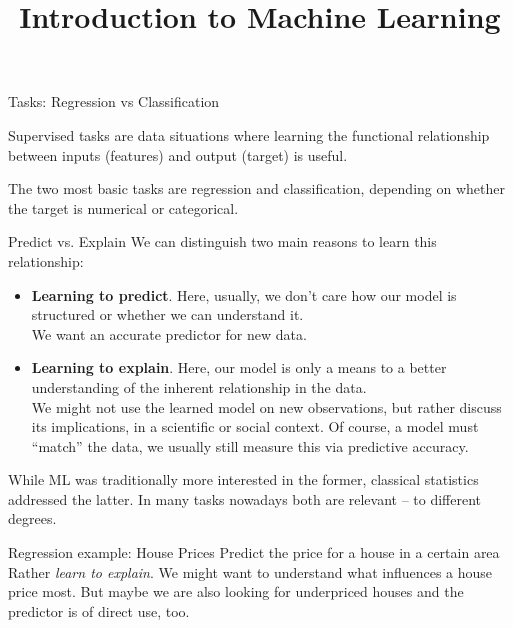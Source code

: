 \documentclass[11pt,compress,t,notes=noshow, xcolor=table]{beamer}
\title{Introduction to Machine Learning}
\begin{document}


\begin{framei}{Tasks: Regression vs Classification}
\item Supervised tasks are data situations where learning the functional relationship between inputs (features) and output (target) is useful.
\item The two most basic tasks are regression and classification, depending on whether the target is numerical or categorical.
\vfill
{}
\end{framei}


\begin{frame2}{Predict vs. Explain}
We can distinguish two main reasons to learn this relationship:
\begin{itemize}
\item \textbf{Learning to predict}. Here, usually, we don't care how our model is structured or whether we can understand it.\\
We want an accurate predictor for new data.
\item \textbf{Learning to explain}. Here, our model is only a means to a better understanding of the inherent relationship in the data.\\
We might not use the learned model on new observations, but rather discuss its implications, in a scientific or social context.
Of course, a model must ``match'' the data, we usually still measure this via predictive accuracy. 
\end{itemize}  
\vfill
While ML was traditionally more interested in the former, classical statistics addressed the latter.
In many tasks nowadays both are relevant -- to different degrees.
\end{frame2}


\begin{frame2}{Regression example: House Prices}
Predict the price for a house in a certain area
\vfill
{} %
\vfill
{}
\vfill
Rather \textit{learn to explain}. We might want to understand what influences a house price most.
But maybe we are also looking for underpriced houses and the predictor is of direct use, too.
\end{frame2}
\end{document}

